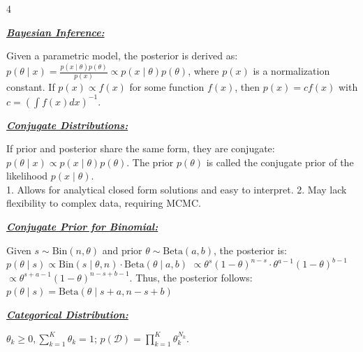 \documentclass[10pt]{article}
\newcommand{\bulletPoint}[1]{\ul{\textit{\textbf{#1}}}}
\begin{document}
\begin{multicols*}{4}

\bulletPoint{Bayesian Inference:} \quad

Given a parametric model, the posterior is derived as: $p(\theta \mid x) = \frac{p(x \mid \theta) p(\theta)}{p(x)} \propto p(x \mid \theta) p(\theta)$,
where $p(x)$ is a normalization constant.
If $p(x) \propto f(x)$ for some function $f(x)$, then $p(x) = c f(x)$ with 
$c = \left( \int f(x) dx \right)^{-1}$.

\bulletPoint{Conjugate Distributions:} \quad

If prior and posterior share the same form, they are conjugate:
$p(\theta \mid x) \propto p(x \mid \theta) p(\theta)$.
The prior $p(\theta)$ is called the conjugate prior of the likelihood $p(x \mid \theta)$.\\
1. Allows for analytical closed form solutions and easy to interpret. 
2. May lack flexibility to complex data, requiring MCMC.


\bulletPoint{Conjugate Prior for Binomial:} \quad

Given $s \sim \text{Bin}(n, \theta)$ and prior $\theta \sim \text{Beta}(a, b)$, the posterior is:
$p(\theta \mid s) \propto \text{Bin}(s \mid \theta, n) \cdot \text{Beta}(\theta \mid a, b)$
$\propto \theta^s (1 - \theta)^{n-s} \cdot \theta^{a-1} (1 - \theta)^{b-1}$
$\propto \theta^{s+a-1} (1 - \theta)^{n-s+b-1}$. 
Thus, the posterior follows:
$p(\theta \mid s) = \text{Beta}(\theta \mid s + a, n - s + b)$

\bulletPoint{Categorical Distribution:} \quad

$\theta_k \geq 0, \sum_{k=1}^{K} \theta_k = 1$;
$p(\mathcal{D}) = \prod_{k=1}^{K} \theta_k^{N_k}$.



\end{multicols*}
\end{document}
